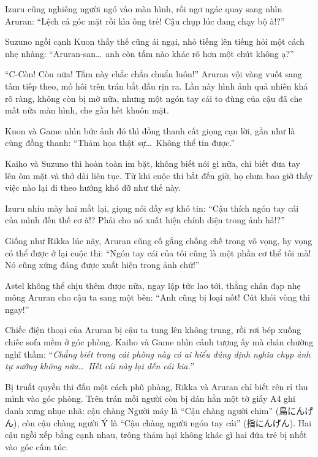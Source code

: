 \documentclass[../main.tex]{subfiles}
\begin{document}
Izuru cũng nghiêng người ngó vào màn hình, rồi ngơ ngác quay sang nhìn Aruran: ``Lệch cả góc mặt rồi kìa ông trẻ! Cậu chụp lúc đang chạy bộ à!?''

Suzuno ngồi cạnh Kuon thấy thế cũng ái ngại, nhỏ tiếng lên tiếng hỏi một cách nhẹ nhàng: ``Aruran-san\dots\ anh còn tấm nào khác rõ hơn một chút không ạ?''

``C-Còn! Còn nữa! Tấm này chắc chắn chuẩn luôn!'' Aruran vội vàng vuốt sang tấm tiếp theo, mồ hôi trên trán bắt đầu rịn ra. Lần này hình ảnh quả nhiên khá rõ ràng, không còn bị mờ nữa, nhưng một ngón tay cái to đùng của cậu đã che mất nửa màn hình, che gần hết khuôn mặt.


Kuon và Game nhìn bức ảnh đó thì đồng thanh cất giọng cạn lời, gần như là cùng đồng thanh: ``Thảm họa thật sự\dots\ Không thể tin được.''

Kaiho và Suzuno thì hoàn toàn im bặt, không biết nói gì nữa, chỉ biết đưa tay lên ôm mặt và thở dài liên tục. Từ khi cuộc thi bắt đến giờ, họ chưa bao giờ thấy việc nào lại đi theo hướng khó đỡ như thế này.

Izuru nhíu mày hai mắt lại, giọng nói đầy sự khó tin: ``Cậu thích ngón tay cái của mình đến thế cơ à!? Phải cho nó xuất hiện chính diện trong ảnh hả!?''

Giống như Rikka lúc nãy, Aruran cũng cố gắng chống chế trong vô vọng, hy vọng có thể được ở lại cuộc thi: ``Ngón tay cái của tôi cũng là một phần cơ thể tôi mà! Nó cũng xứng đáng được xuất hiện trong ảnh chứ!''

Astel không thể chịu thêm được nữa, ngay lập tức lao tới, thẳng chân đạp nhẹ mông Aruran cho cậu ta sang một bên: ``Anh cũng bị loại nốt! Cút khỏi vòng thi ngay!''

Chiếc điện thoại của Aruran bị cậu ta tung lên không trung, rồi rơi bép xuống chiếc sofa mềm ở góc phòng. Kaiho và Game nhìn cảnh tượng ấy mà chán chường nghĩ thầm: ``\textit{Chẳng biết trong cái phòng này có ai hiểu đúng định nghĩa chụp ảnh tự sướng không nữa\dots\ Hết cái này lại đến cái kia.}''

\ct

Bị truất quyền thi đấu một cách phũ phàng, Rikka và Aruran chỉ biết rên rỉ thu mình vào góc phòng. Trên trán mỗi người còn bị dán hẳn một tờ giấy A4 ghi danh xưng nhục nhã: cậu chàng Người máy là ``Cậu chàng người chim'' (鳥にんげん), còn cậu chàng người Ý là ``Cậu chàng người ngón tay cái'' (指にんげん). Hai cậu ngồi xếp bằng cạnh nhau, trông thảm hại không khác gì hai đứa trẻ bị nhốt vào góc cấm túc.
\end{document}
